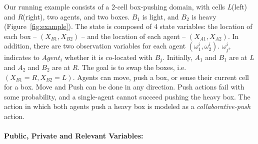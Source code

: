 \documentclass[runningheads]{llncs}
\newcommand{\citep}{\cite}
\newcommand{\commentout}[1]{}
\begin{document}
\begin{example}
Our running example consists of a 2-cell box-pushing domain, with cells \emph{L}(left) and \emph{R}(right), two agents, and two boxes.
$B_1$ is light, and $B_2$ is heavy (Figure~\ref{fig:example}).
The state is composed of 4 state variables: the location of each box -- $(X_{B1}, X_{B2})$ -- and the location of each agent -- $(X_{A1}, X_{A2})$.
In addition, there are two observation variables for each agent $(\omega^i_1, \omega^i_2)$. $\omega^i_j$, indicates to $Agent_i$ whether it is co-located with $B_j$.
Initially, 
$A_1$ and $B_1$ are at \emph{L} and $A_2$ and $B_2$ are at \emph{R}.
The goal is to swap the boxes, i.e.
$(X_{B1}=R, X_{B2}=L)$.
Agents can move, push a box, or sense their current cell for a box. Move and Push can be done in any direction. Push actions fail with some probability, and a single-agent cannot succeed pushing the heavy box. The action in which both agents push a heavy box
is modeled as
a \emph{collaborative-push} action.  
\end{example}

\commentout{
\begin{example}
Let us now make $B_1$ heavy. 
Such a box requires both agents to push it.
We call the joint-action of both agents pushing the box 
\emph{collaborative-push}. Only if both agents push $B_1$ in the same direction, it moves. Otherwise, it does not.
Notice that pushing a non-heavy box in different directions are two interacting actions, too. Thus, a specification of a collaborative action of this form must also be included.
For a more detailed discussion of the compact specification of joint-actions, see~\citep{INTERPRIVATE}. 
\end{example}
}


\paragraph{Public, Private and Relevant Variables:}
\end{document}
